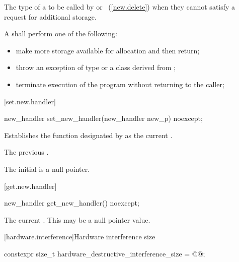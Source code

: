 \begin{itemdescr}
\pnum
The type of a
to be called by
or
~(\ref{new.delete}) when they cannot satisfy a request for additional storage.

\pnum
\required
A  shall perform one of the following:

\begin{itemize}
\item
make more storage available for allocation and then return;
\item
throw an exception of type
or a class derived from
%
;
\item
terminate execution of the program without returning to the caller;
%
%
\end{itemize}
\end{itemdescr}

[set.new.handler]{}

%
\begin{itemdecl}
new_handler set_new_handler(new_handler new_p) noexcept;
\end{itemdecl}

\begin{itemdescr}
\pnum
\effects
Establishes the function designated by  as the current
.

\pnum
\returns
The previous .

\pnum
\remarks
The initial  is a null pointer.
\end{itemdescr}

[get.new.handler]{}

\begin{itemdecl}
new_handler get_new_handler() noexcept;
\end{itemdecl}

\begin{itemdescr}
\pnum
\returns The current .
\enternote This may be a null pointer value. \exitnote
\end{itemdescr}

[hardware.interference]{Hardware interference size}

%
\begin{codeblock}
constexpr size_t hardware_destructive_interference_size = @\impdef{}@;
\end{codeblock}

